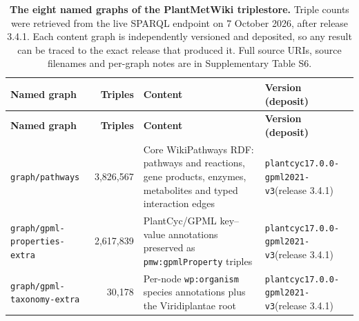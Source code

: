 \documentclass[11pt,a4paper]{article}
\newcommand{\rev}[1]{#1}
\begin{document}
%
{\footnotesize
\begin{longtable}{@{}>{\raggedright\arraybackslash}p{}
                    r@{\hspace{1.2em}}
                    >{\raggedright\arraybackslash}p{}
                    >{\raggedright\arraybackslash}p{}@{}}
\caption{\textbf{The eight named graphs of the PlantMetWiki triplestore.}
\rev{Triple counts were retrieved from the live SPARQL endpoint on 7 October 2026, after release 3.4.1.}
Each content graph is independently versioned and deposited, so any result can
be traced to the exact release that produced it. Full source URIs, source
filenames and per-graph notes are in Supplementary Table S6.}
\label{tab:graphs}\\
\toprule
\textbf{Named graph} & \textbf{Triples} & \textbf{Content} & \textbf{Version (deposit)} \\
\midrule
\endfirsthead
\toprule
\textbf{Named graph} & \textbf{Triples} & \textbf{Content} & \textbf{Version (deposit)} \\
\midrule
\endhead
\bottomrule
\endfoot
\texttt{graph/pathways} & \rev{3,826,567} &
Core WikiPathways RDF: pathways and reactions, gene products, enzymes,
metabolites and typed interaction edges &
\texttt{plantcyc17.0.0-} \texttt{gpml2021-v3}\newline \rev{(release 3.4.1)}~\cite{delpup2026rdf} \\
\addlinespace
\texttt{graph/gpml-} \texttt{properties-extra} & 2,617,839 &
PlantCyc/GPML key--value annotations preserved as \texttt{pmw:gpmlProperty}
triples &
\texttt{plantcyc17.0.0-} \texttt{gpml2021-v3}\newline \rev{(release 3.4.1)}~\cite{delpup2026rdf} \\
\addlinespace
\texttt{graph/gpml-} \texttt{taxonomy-extra} & 30,178 &
Per-node \texttt{wp:organism} species annotations plus the Viridiplantae root &
\texttt{plantcyc17.0.0-} \texttt{gpml2021-v3}\newline \rev{(release 3.4.1)}~\cite{delpup2026rdf} \\

\end{longtable}}
\end{document}
